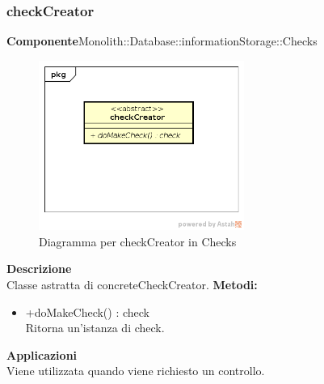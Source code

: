 \subsubsection{checkCreator}
\textbf{Componente}Monolith::Database::informationStorage::Checks\\
   \FloatBarrier
   \begin{figure}[ht]
   \centering
   \includegraphics[width=0.6\textwidth]{img/single-checkCreator}
   \caption{{Diagramma per checkCreator in Checks}}
\end{figure}
\FloatBarrier
\textbf{Descrizione}\\
Classe astratta di concreteCheckCreator.
\textbf{Metodi:} \begin{itemize}\item +doMakeCheck() : check \\Ritorna un'istanza di check.\end{itemize} 


\textbf{Applicazioni}\\
Viene utilizzata quando viene richiesto un controllo. 


\clearpage

